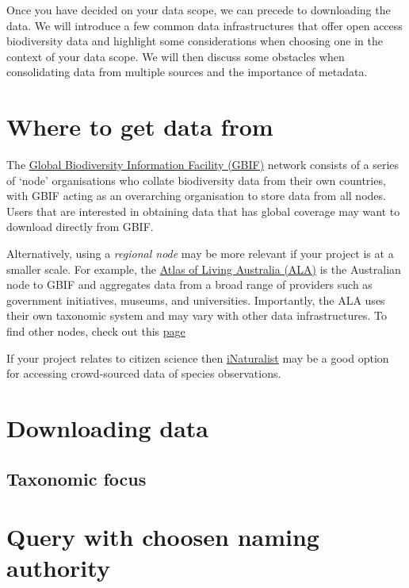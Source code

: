 \documentclass[
  letterpaper,
  DIV=11,
  numbers=noendperiod,
  oneside]{scrreprt}
\begin{document}
Once you have decided on your data scope, we can precede to downloading
the data. We will introduce a few common data infrastructures that offer
open access biodiversity data and highlight some considerations when
choosing one in the context of your data scope. We will then discuss
some obstacles when consolidating data from multiple sources and the
importance of metadata.

\hypertarget{where-to-get-data-from}{%
\section{Where to get data from}\label{where-to-get-data-from}}

The \href{https://www.gbif.org/}{Global Biodiversity Information
Facility (GBIF)} network consists of a series of `node' organisations
who collate biodiversity data from their own countries, with GBIF acting
as an overarching organisation to store data from all nodes. Users that
are interested in obtaining data that has global coverage may want to
download directly from GBIF.

Alternatively, using a \emph{regional node} may be more relevant if your
project is at a smaller scale. For example, the
\href{www.ala.org.au}{Atlas of Living Australia (ALA)} is the Australian
node to GBIF and aggregates data from a broad range of providers such as
government initiatives, museums, and universities. Importantly, the ALA
uses their own taxonomic system and may vary with other data
infrastructures. To find other nodes, check out this
\href{https://www.gbif.org/the-gbif-network}{page}

If your project relates to citizen science then
\href{https://www.inaturalist.org/}{iNaturalist} may be a good option
for accessing crowd-sourced data of species observations.

\hypertarget{downloading-data}{%
\section{Downloading data}\label{downloading-data}}

\hypertarget{taxonomic-focus}{%
\subsection{Taxonomic focus}\label{taxonomic-focus}}

\hypertarget{query-with-choosen-naming-authority}{%
\section{Query with choosen naming
authority}\label{query-with-choosen-naming-authority}}
\end{document}
